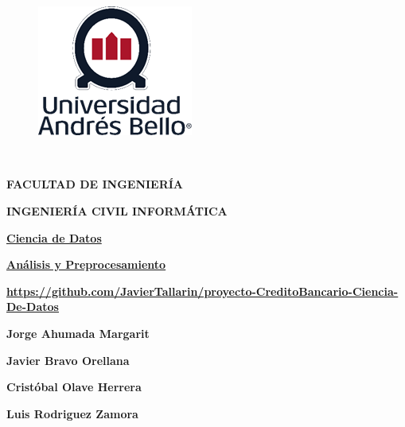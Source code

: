 \documentclass[12pt]{report}
\date{}
\renewcommand{\_}{\kern-1.5pt\textunderscore\kern-1.5pt}
\begin{document}

\begin{figure}[H]
	\begin{Center}
		\includegraphics[width=2.01in,height=1.69in]{./media/image7.png}
	\end{Center}
\end{figure}



\setlength{\parskip}{12.0pt}
\begin{Center}
\textbf{\   }
\end{Center}
\begin{Center}
\textbf{FACULTAD DE INGENIERÍA}
\end{Center}
\begin{Center}
\textbf{INGENIERÍA CIVIL INFORMÁTICA}
\end{Center}
\begin{Center}
{\fontsize{20pt}{24.0pt}\selectfont  }
\end{Center}

\vspace{\baselineskip}
 {\fontsize{20pt}{24.0pt}\selectfont \textbf{\uline{ }}}
\begin{Center}
{\fontsize{20pt}{24.0pt}\selectfont \textbf{\uline{Ciencia de Datos}}}
\end{Center}

\vspace{\baselineskip}
\begin{Center}
{\fontsize{20pt}{24.0pt}\selectfont \textbf{\uline{Análisis y Preprocesamiento}}}
\end{Center}
\begin{Center}
{\fontsize{20pt}{24.0pt}\selectfont \textbf{\uline{\url{https://github.com/JavierTallarin/proyecto-CreditoBancario-Ciencia-De-Datos}}}}
\end{Center}
 
 
 
\begin{Center}
 \textbf{Jorge Ahumada Margarit}
\end{Center}
\begin{Center}
\textbf{Javier Bravo Orellana}
\end{Center}
\begin{Center}
\textbf{Cristóbal Olave Herrera}
\end{Center}
\begin{Center}
\textbf{Luis Rodriguez Zamora}
\end{Center}
\end{document}
